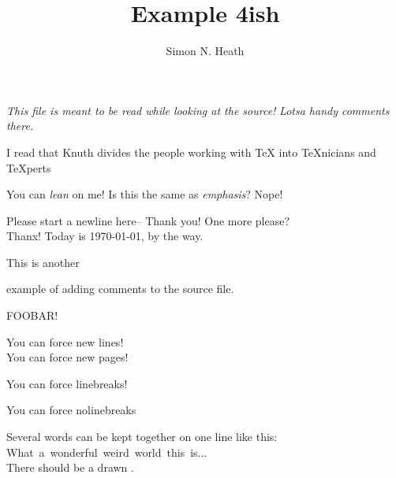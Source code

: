 \documentclass[10pt,letterpaper,notitlepage,oneside]{article}
\author{Simon N. Heath}
\title{Example 4ish}
\begin{document}
\maketitle 

\emph{This file is meant to be read while looking at the source!}
\emph{Lotsa handy comments there.}

I read that Knuth divides the people working with \TeX{} into
\TeX{}nicians and \TeX perts

You can \textsl{lean} on me!  Is this the same as \emph{emphasis}?  Nope!

Please start a newline here--\newline
Thank you!  One more please?\\
Thanx! Today is \today{}, by the way.

This is another
\begin{comment}
Other than %
You have to add \usepackage{verbatim} to the doc preamble,
though.
\end{comment}
example of adding comments to the source file.



FOOBAR!



You can force new lines!\\

You can force new pages!\newpage

You can force linebreaks!\linebreak[4]  %

You can force nolinebreaks\nolinebreak[4]


Several words can be kept together on one line like this: \mbox{What a 
wonderful weird world this is...} \\
There should be a  drawn .
\end{document}
